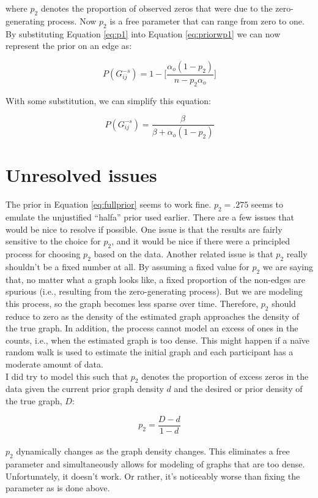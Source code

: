 \documentclass[12pt]{article}
\begin{document}
\noindent
where $p_2$ denotes the proportion of observed zeros that were due to the zero-generating process. Now $p_2$ is a free parameter that can range from zero to one. By substituting Equation \ref{eq:p1} into Equation \ref{eq:priorwp1} we can now represent the prior on an edge as:

\begin{equation}
    \label{eq:fullprior}
    P(G^{-s}_{ij}) = 1 - \Bigg[\frac{\alpha_o(1 - p_2)}{n - p_2\alpha_o}\Bigg]
\end{equation}

\noindent
With some substitution, we can simplify this equation:

\begin{equation}
    \label{eq:fullprior}
    P(G^{-s}_{ij}) = \frac{\beta}{\beta + \alpha_o(1-p_2)}
\end{equation}

\section{Unresolved issues}

The prior in Equation \ref{eq:fullprior} seems to work fine. $p_2 = .275$ seems to emulate the unjustified ``halfa'' prior used earlier. There are a few issues that would be nice to resolve if possible. One issue is that the results are fairly sensitive to the choice for $p_2$, and it would be nice if there were a principled process for choosing $p_2$ based on the data. Another related issue is that $p_2$ really shouldn't be a fixed number at all. By assuming a fixed value for $p_2$ we are saying that, no matter what a graph looks like, a fixed proportion of the non-edges are spurious (i.e., resulting from the zero-generating process). But we are modeling this process, so the graph becomes less sparse over time. Therefore, $p_2$ should reduce to zero as the density of the estimated graph approaches the density of the true graph. In addition, the process cannot model an excess of ones in the counts, i.e., when the estimated graph is too dense. This might happen if a naïve random walk is used to estimate the initial graph and each participant has a moderate amount of data. \\

I did try to model this such that $p_2$ denotes the proportion of excess zeros in the data given the current prior graph density $d$ and the desired or prior density of the true graph, $D$:

\begin{equation}
    p_2 = \frac{D-d}{1-d}
\end{equation} \\

\noindent
$p_2$ dynamically changes as the graph density changes. This eliminates a free parameter and simultaneously allows for modeling of graphs that are too dense. Unfortunately, it doesn't work. Or rather, it's noticeably worse than fixing the parameter as is done above.
\end{document}
